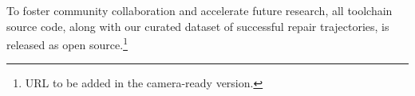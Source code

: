 \documentclass[conference]{IEEEtran}
\begin{document}
To foster community collaboration and accelerate future research, all toolchain source code, along with our curated dataset of successful repair trajectories, is released as open source.\footnote{URL to be added in the camera-ready version.%
}



\end{document}
